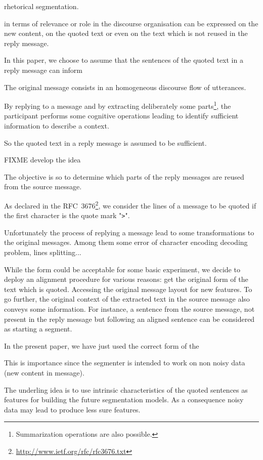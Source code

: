 rhetorical segmentation. 

in terms of relevance or role in the discourse organisation can be expressed on the new content, on the quoted text or even on the text which is not reused in the reply message.

In this paper, we choose to assume that the sentences of the quoted text in a reply message can inform

The original message consists in an homogeneous discourse flow of utterances. 

By replying to a message and by extracting deliberately some parts\footnote{Summarization operations are also possible.}, the participant performs some cognitive operations leading to identify sufficient information to describe a context.

So the quoted text in a reply message is assumed to be sufficient. 

FIXME develop the idea

The objective is so to determine which parts of the reply messages are reused from the source message.

As declared in the RFC~3676\footnote{\url{http://www.ietf.org/rfc/rfc3676.txt}}, we consider the lines of a message to be quoted if the first character is the quote mark "\texttt{>}".

Unfortunately the process of replying a message lead to some transformations to the original messages. Among them some error of character encoding decoding problem, lines splitting... 

While the form could be acceptable for some basic experiment, we decide to deploy an alignment procedure for various reasons: get the original form of the text which is quoted. 
Accessing the original message layout for new features. 
To go further, the original context of the extracted text in the source message also conveys some information.
For instance, a sentence from the source message, not present in the reply message but following an aligned sentence can be considered as starting a segment.

In the present paper, we have just used the correct form of the 

This is importance since the segmenter is intended to work on non noisy data (new content in message).

The underling idea is to use intrinsic characteristics of the quoted sentences as features for building the future segmentation models. As a consequence noisy data may lead to produce less sure features.


